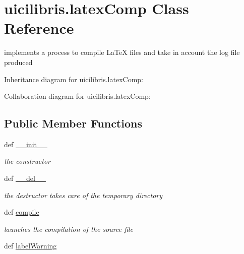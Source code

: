 \hypertarget{classuicilibris_1_1latexComp}{\section{uicilibris.\-latex\-Comp \-Class \-Reference}
\label{classuicilibris_1_1latexComp}
}


implements a process to compile \-La\-Te\-X files and take in account the log file produced  




\-Inheritance diagram for uicilibris.\-latex\-Comp\-:


\-Collaboration diagram for uicilibris.\-latex\-Comp\-:
\subsection*{\-Public \-Member \-Functions}
\begin{DoxyCompactItemize}
\item 
def \hyperlink{classuicilibris_1_1latexComp_aaea2a8829e4df2daf4bad3e7aac6d03c}{\-\_\-\-\_\-init\-\_\-\-\_\-}
\begin{DoxyCompactList}\small\item\em the constructor \end{DoxyCompactList}\item 
def \hyperlink{classuicilibris_1_1latexComp_ae6165e417ac4520218f920db41a2d5a9}{\-\_\-\-\_\-del\-\_\-\-\_\-}
\begin{DoxyCompactList}\small\item\em the destructor takes care of the temporary directory \end{DoxyCompactList}\item 
def \hyperlink{classuicilibris_1_1latexComp_a398668b3ed295e02ea572a3963650de9}{compile}
\begin{DoxyCompactList}\small\item\em launches the compilation of the source file \end{DoxyCompactList}\item 
def \hyperlink{classuicilibris_1_1latexComp_a485cce2ece2e229a22aa21e4a2d28459}{label\-Warning}
\end{DoxyCompactItemize}
